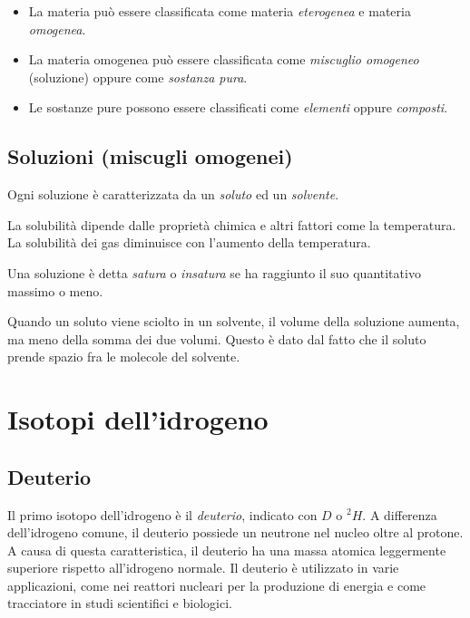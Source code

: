 \documentclass[a4paper]{article}
\begin{document}
\begin{itemize}
    \item La materia può essere classificata come materia \textit{eterogenea}
    e materia \textit{omogenea}.
    
    \item La materia omogenea può essere classificata come \textit{miscuglio omogeneo} (soluzione)
    oppure come \textit{sostanza pura}.
    
    \item Le sostanze pure possono essere classificati come \textit{elementi} oppure \textit{composti}.
\end{itemize}

\pagebreak

\subsection{Soluzioni (miscugli omogenei)}

Ogni soluzione è caratterizzata
da un \textit{soluto} ed un \textit{solvente}.

La solubilità dipende dalle proprietà chimica e altri fattori come la temperatura.
La solubilità dei gas diminuisce con l'aumento della temperatura.

Una soluzione è detta \textit{satura} o \textit{insatura}
se ha raggiunto il suo quantitativo massimo o meno.

Quando un soluto viene sciolto in un solvente, il volume della soluzione aumenta,
ma meno della somma dei due volumi. Questo è dato dal fatto che il soluto prende spazio fra le molecole del solvente.

\pagebreak

\section{Isotopi dell'idrogeno}

\subsection{Deuterio}

Il primo isotopo dell'idrogeno è il \textit{deuterio}, indicato con \(D\) o \(^2H\).
A differenza dell'idrogeno comune, il deuterio possiede un neutrone nel nucleo oltre al protone.
A causa di questa caratteristica, il deuterio ha una massa atomica leggermente superiore rispetto all'idrogeno normale.
Il deuterio è utilizzato in varie applicazioni, come nei reattori nucleari per la produzione di energia e come tracciatore in studi scientifici e biologici. 
\end{document}
